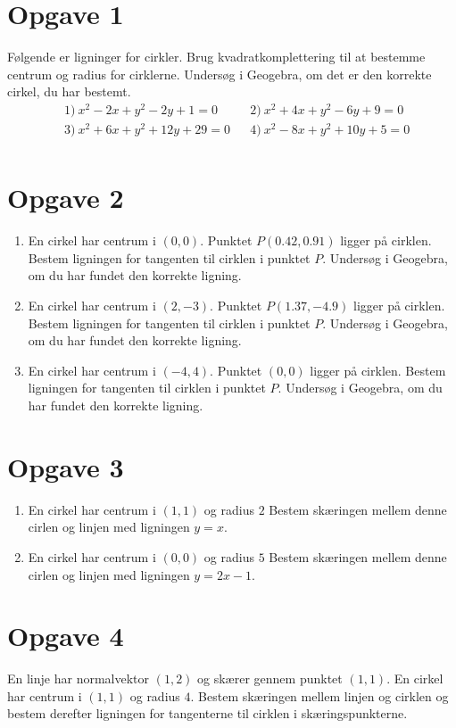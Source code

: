 \section*{Opgave 1}
Følgende er ligninger for cirkler. Brug kvadratkomplettering til at bestemme centrum og radius for cirklerne. Undersøg i Geogebra, om det er den korrekte cirkel, du har bestemt.
\begin{align*}
&1) \ x^2-2x+y^2-2y+1=0   &&2) \  x^2+4x+y^2-6y+9=0   \\
&3) \ x^2+6x+y^2+12y+29=0  &&4) \ x^2-8x+y^2+10y+5=0   \\
\end{align*}
\section*{Opgave 2}
\begin{enumerate}[label=\roman*)]
\item En cirkel har centrum i $(0,0)$. Punktet $P(0.42,0.91)$ ligger på cirklen. Bestem ligningen for tangenten til cirklen i punktet $P$. Undersøg i Geogebra, om du har fundet den korrekte ligning.
\item En cirkel har centrum i $(2,-3)$. Punktet $P(1.37,-4.9)$ ligger på cirklen. Bestem ligningen for tangenten til cirklen i punktet $P$. Undersøg i Geogebra, om du har fundet den korrekte ligning.
\item En cirkel har centrum i $(-4,4)$. Punktet $(0,0)$ ligger på cirklen. Bestem ligningen for tangenten til cirklen i punktet $P$. Undersøg i Geogebra, om du har fundet den korrekte ligning.
\end{enumerate}

\section*{Opgave 3}
\begin{enumerate}[label=\roman*)]
\item En cirkel har centrum i $(1,1)$ og radius $2$ Bestem skæringen mellem denne cirlen og linjen med ligningen $y=x$.
\item En cirkel har centrum i $(0,0)$ og radius $5$ Bestem skæringen mellem denne cirlen og linjen med ligningen $y=2x-1$.
\end{enumerate}

\section*{Opgave 4}
En linje har normalvektor $(1,2)$ og skærer gennem punktet $(1,1)$. En cirkel har centrum i $(1,1)$ og radius $4$. Bestem skæringen mellem linjen og cirklen og bestem derefter ligningen for tangenterne til cirklen i skæringspunkterne. 



